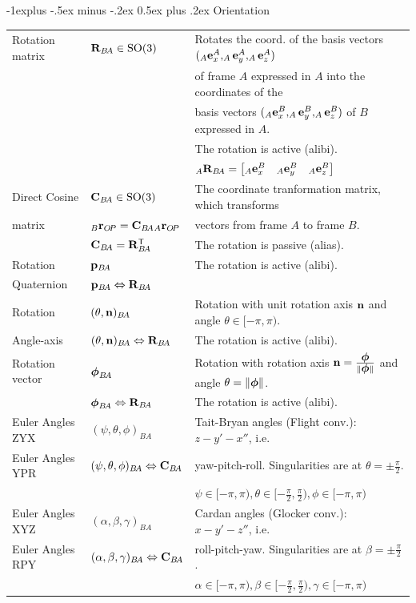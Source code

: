 \documentclass[10pt,landscape,a4paper]{article}
\makeatletter
\renewcommand{\subsection}{\@startsection{subsection}{2}{0mm}%
                                {-1explus -.5ex minus -.2ex}%
                                {0.5ex plus .2ex}%
                                {\normalfont\normalsize\bfseries}}
\newcommand\norm[1]{\lVert #1 \rVert}
\newcommand\transpose{\mathsf{T}}
\newcommand\pos[3]{{}_#1\vr_{#2\!#3}}
\newcommand\rotmat[2]{\vR_{#1\!#2}}
\newcommand\comat[2]{\vC_{#1\!#2}}
\newcommand\quat[2]{\vp_{#1\!#2}}
\newcommand\angleaxis[2]{(\theta,\vn)_{#1\!#2}}
\newcommand\rotvec[2]{\vvph_{#1\!#2}}
\makeatother
\begin{document}
\begin{multicols}{2}
\subsection{Orientation}
\begin{tabular}{|l|l@{}|l@{}|}
\hline
Rotation matrix & $\rotmat{B}{A} \in \mathrm{SO}(3)$ & Rotates the coord. of the basis vectors $(_A\mathbf e_x^A, _A\mathbf e_y^A, _A\mathbf e_z^A)$ \\
 & & of frame $A$ expressed in $A$  into the coordinates of the  \\
& & basis vectors $(_A\mathbf e_x^B, _A\mathbf e_y^B, _A\mathbf e_z^B)$ of $B$ expressed in $A$. \\ 
 &  &  The rotation is active (alibi). \\
& & $_A\rotmat{B}{A} = \begin{bmatrix}_A\ve_x^B & _A\ve_y^B & _A\ve_z^B\end{bmatrix}$ \\ \hline
Direct Cosine& $\comat{B}{A} \in \mathrm{SO}(3)$ & The coordinate tranformation matrix, which transforms \\  
 matrix & $ \pos{B}{O}{P} = \comat{B}{A} \pos{A}{O}{P}$ & vectors from frame $A$ to frame $B$. \\
& $\comat{B}{A} = \rotmat{B}{A}^\transpose$ & The rotation is passive (alias). \\  \hline 
 Rotation  & $\quat{B}{A}$ & The rotation is active (alibi). \\
Quaternion &   $\quat{B}{A} \Leftrightarrow \rotmat{B}{A} $ &  \\ \hline
Rotation & $\angleaxis{B}{A}$ &   Rotation with unit rotation axis $\mathbf n$ and angle $\theta \in [-\pi, \pi)$. \\
Angle-axis & $\angleaxis{B}{A} \Leftrightarrow \rotmat{B}{A}$  & The rotation is active (alibi). \\ \hline
Rotation vector & $ \rotvec{B}{A} $  &  Rotation with rotation axis $\vn = \frac{\vvph}{\norm{\vvph}}$ and angle $\theta = \norm{\vvph}$. \\ 
 & $\rotvec{B}{A} \Leftrightarrow \rotmat{B}{A} $ &  The rotation is active (alibi). \\ \hline
Euler Angles ZYX &  $(\psi, \theta, \phi)_{B\!A}$  & Tait-Bryan angles (Flight conv.): $z-y'-x''$, i.e.\   \\
Euler Angles YPR & $(\psi, \theta, \phi)_{B\!A} \Leftrightarrow \comat{B}{A} $ & yaw-pitch-roll. Singularities are at $\theta=\pm\frac{\pi}{2}$. \\
 &  & $\psi\in[-\pi,\pi), \theta\in[-\frac{\pi}{2},\frac{\pi}{2}), \phi\in[-\pi,\pi)$  \\  \hline
Euler Angles XYZ &  $(\alpha, \beta, \gamma)_{B\!A}$ & Cardan angles (Glocker conv.): $x-y'-z''$, i.e.\ \\
Euler Angles RPY & $(\alpha, \beta, \gamma)_{B\!A} \Leftrightarrow \comat{B}{A}$ & roll-pitch-yaw. Singularities are at $\beta=\pm\frac{\pi}{2}$.  \\
 &  & $\alpha\in[-\pi,\pi), \beta\in[-\frac{\pi}{2},\frac{\pi}{2}), \gamma\in[-\pi,\pi)$  \\  \hline
\end{tabular} %


\end{multicols}
\end{document}
